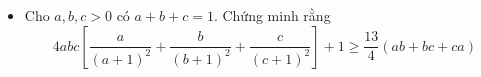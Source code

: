 \documentclass[11pt]{scrartcl}
\begin{document}
\begin{itemize}[label=, leftmargin=0em, itemsep=-0em]

            \item\begin{btvn}
                Cho $a,b,c > 0$ có $a + b + c = 1$. Chứng minh rằng
                \[
                    4abc\left[\frac{a}{(a + 1)^2} + \frac{b}{(b + 1)^2} + \frac{c}{(c + 1)^2}\right] + 1 \geq \frac{13}{4}(ab + bc + ca)
                \]
            \end{btvn}

\end{itemize}
\end{document}
